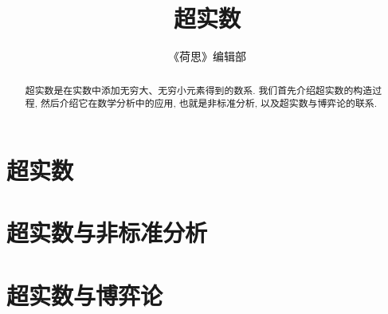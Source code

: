 \documentclass[twoside]{article}
\begin{document}
\title{超实数}
\author{《荷思》编辑部}

\begin{abstract}
    超实数是在实数中添加无穷大、无穷小元素得到的数系.
    我们首先介绍超实数的构造过程,
    然后介绍它在数学分析中的应用, 也就是非标准分析,
    以及超实数与博弈论的联系.
\end{abstract}

\tableofcontents

\clearpage

\section{超实数} \label{sect-1}



\section{超实数与非标准分析} \label{sect-2}



\section{超实数与博弈论} \label{sect-3}



\printbibliography
\end{document}
